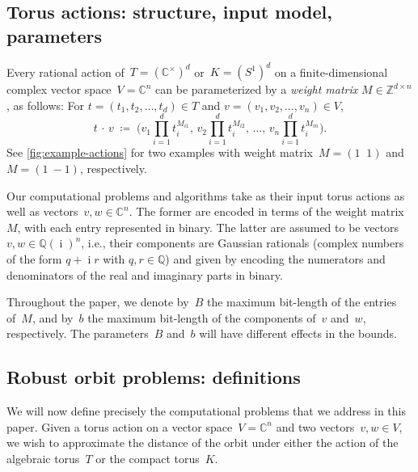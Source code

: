 \documentclass[a4paper,USenglish,cleveref,numberwithinsect]{lipics-v2021}
\DeclareMathOperator{\ii}{i}
\newcommand{\QQ}{\mathbb{Q}}
\newcommand{\CC}{\mathbb{C}}
\newcommand{\ZZ}{\mathbb{Z}}
\numberwithin{equation}{section}
\begin{document}
\subsection{Torus actions: structure, input model, parameters}\label{subsec:structure and input}
Every rational
action of~$T = (\CC^\times)^d$ or~$K = (S^1)^d$ on a finite-dimensional complex vector space~$V=\CC^n$
can be parameterized by a \emph{weight matrix} $M\in\ZZ^{d\times n}$, as follows:
For $t=(t_1,t_2,\dots,t_d)\in T$ and $v=(v_1,v_2,\dots,v_n)\in V$,
\begin{equation}\label{eq:def-action}
  t\,\cdot\, v \; \coloneqq \; \bigg( v_1 \prod_{i=1}^d t_i^{M_{i1}},\, v_2 \prod_{i=1}^d t_i^{M_{i2}},\,
     \dots,\, v_n \prod_{i=1}^d t_i^{M_{in}} \bigg).
\end{equation}
See \cref{fig:example-actions} for two examples with weight matrix~$M=(1 \;\; 1)$ and $M = (1 \ -\!1)$, respectively.

Our computational problems and algorithms take as their input torus actions as well as vectors~$v,w\in\CC^n$.
The former are encoded in terms of the weight matrix~$M$, with each entry represented in binary.
The latter are assumed to be vectors~$v,w \in \QQ(\ii)^n$, i.e., their components are Gaussian rationals
(complex numbers of the form $q + \ii r$ with $q,r\in\QQ$)
and given by encoding the numerators and denominators of the real and imaginary parts in binary.

Throughout the paper, we denote by~$B$ the maximum bit-length of the entries of~$M$, and by~$b$
the maximum bit-length of the components of~$v$ and~$w$, respectively.
The parameters~$B$ and~$b$ will have different effects in the bounds.


\subsection{Robust orbit problems: definitions}\label{subsec:intro defs}

We will now define precisely the computational problems that we address in this paper.
Given a torus action on a vector space~$V=\CC^n$ and two vectors~$v,w\in V$,
we wish to approximate the distance of the orbit under either the action of the algebraic torus~$T$
or the compact torus~$K$.
\end{document}
